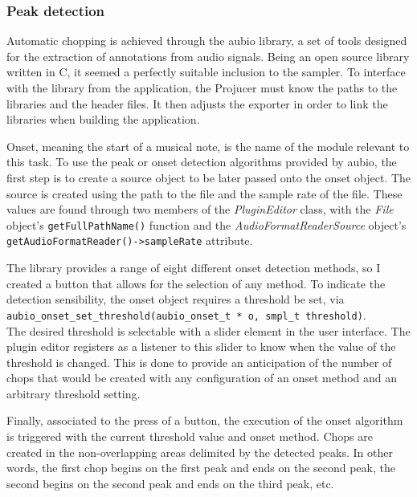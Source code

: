 \documentclass[12pt, a4paper, hidelinks]{article}
\begin{document}
	\subsubsection{Peak detection}
	Automatic chopping is achieved through the aubio library, a set of tools designed for the extraction of annotations from audio signals\cite{aubio}. Being an open source library written in C, it seemed a perfectly suitable inclusion to the sampler. To interface with the library from the application, the Projucer must know the paths to the libraries and the header files. It then adjusts the exporter in order to link the libraries when building the application.\par	
	Onset, meaning the start of a musical note, is the name of the module relevant to this task. To use the peak or onset detection algorithms provided by aubio, the first step is to create a source object to be later passed onto the onset object. The source is created using the path to the file and the sample rate of the file. These values are found through two members of the \textit{PluginEditor} class, with the \textit{File} object's  \texttt{getFullPathName()} function and the \textit{AudioFormatReaderSource} object's \texttt{getAudioFormatReader()->sampleRate} attribute. \par
	
	The library provides a range of eight different onset detection methods, so I created a button that allows for the selection of any method. To indicate the detection sensibility, the onset object requires a threshold be set, via\\
	\texttt{aubio\_onset\_set\_threshold(aubio\_onset\_t * o, smpl\_t threshold)}.\\
	The desired threshold is selectable with a slider element in the user interface. The plugin editor registers as a listener to this slider to know when the value of the threshold is changed. This is done to provide an anticipation of the number of chops that would be created with any configuration of an onset method and an arbitrary threshold setting. \par
	
	Finally, associated to the press of a button, the execution of the onset algorithm is triggered with the current threshold value and onset method. Chops are created in the non-overlapping areas delimited by the detected peaks. In other words, the first chop begins on the first peak and ends on the second peak, the second begins on the second peak and ends on the third peak, etc.
	
\end{document}
